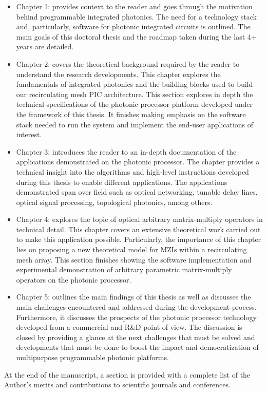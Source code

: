 \begin{itemize}
    \item Chapter 1:  provides context to the reader and goes through the motivation behind programmable integrated photonics.
          The need for a technology stack and, particularly, software for photonic integrated circuits is outlined.
          The main goals of this doctoral thesis and the roadmap taken during the last 4+ years are detailed.
    \item Chapter 2:  covers the theoretical background required by the reader to understand the research developments.
          This chapter explores the fundamentals of integrated photonics and the building blocks used to build our recirculating mesh PIC architecture.
          This section explores in depth the technical specifications of the photonic processor platform developed under the framework of this thesis.
          It finishes making emphasis on the software stack needed to run the system and implement the end-user applications of interest.
    \item Chapter 3:  introduces the reader to an in-depth documentation of the applications demonstrated on the photonic processor.
          The chapter provides a technical insight into the algorithms and high-level instructions developed during this thesis to enable different applications.
          The applications demonstrated span over field such as optical networking, tunable delay lines, optical signal processing, topological photonics, among others.
    \item Chapter 4:  explores the topic of optical arbitrary matrix-multiply operators in technical detail.
          This chapter covers an extensive theoretical work carried out to make this application possible.
          Particularly, the importance of this chapter lies on proposing a new theoretical model for MZIs within a recirculating mesh array.
          This section finishes showing the software implementation and experimental demonstration of arbitrary parametric matrix-multiply operators on the photonic processor.
    \item Chapter 5:  outlines the main findings of this thesis as well as discusses the main challenges encountered and addressed during the development process.
          Furthermore, it discusses the prospects of the photonic processor technology developed from a commercial and R\&D point of view.
          The discussion is closed by providing a glance at the next challenges that must be solved and developments that must be done to boost the impact and democratization of multipurpose programmable photonic platforms.
\end{itemize}

At the end of the manuscript, a section is provided with a complete list of the Author’s merits and contributions to scientific journals and conferences.